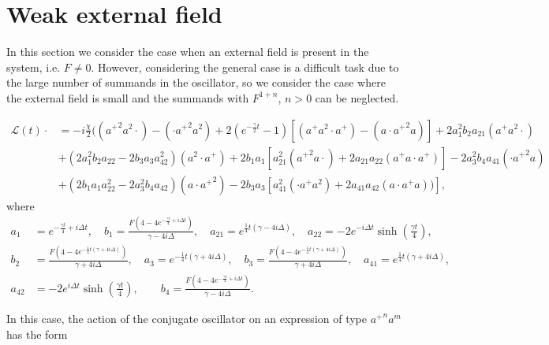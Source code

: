 \documentclass[12pt]{article}
\theoremstyle{definition}
\def\ga {\gamma}
\begin{document}
	\section{Weak external field\label{sec:Efc}}
	
	In this section we consider the case when an external field is present in the system, i.e. $F \not= 0$. However, considering the general case is a difficult task due to the large number of summands in the oscillator, so we consider the case where the external field is small and the summands with $F^{1 + n}$, $n > 0$ can be neglected. 
	
	\begin{align}
		\label{eq:GenIntWithF}
		\mathcal{L}(t)\cdot &= -i\frac{\chi}{2}(({a^+}^2a^2\cdot) - (\cdot{a^+}^2a^2) + 2(e^{-\frac{\ga}{2}t} -1 ) [({a^+}a^2\cdot {a^+}) - (a\cdot{a^+}^2a) ] +2a_1^2b_2a_{21}({a^+}a^2\cdot) \nonumber\\
		&+ (2a_1^2b_2a_{22} - 2b_3a_3a_{42}^2)(a^2\cdot{a^+}) + 2b_1a_1 [a_{21}^2({a^+}^2a\cdot) + 2a_{21}a_{22}({a^+}a\cdot{a^+})] - 2a_3^2b_4a_{41}(\cdot{a^+}^2a) \\
		&+ (2b_1a_1a_{22}^2 - 2a_3^2b_4a_{42})(a\cdot{a^+}^2) - 2b_3a_3[a_{41}^2(\cdot{a^+}a^2) + 2 a_{41}a_{42}(a\cdot{a^+}a)) ]\nonumber,
	\end{align}
	where
	\begin{align*}
		a_1 &= e^{-\frac{\gamma  t}{4}+i \Delta  t}, \quad
		b_1 = \frac{F \left(4-4 e^{-\frac{\gamma  t}{4}+i \Delta  t}\right)}{\gamma -4 i \Delta }, \quad
		a_{21} = e^{\frac{1}{4} t (\gamma -4 i \Delta )}, \quad
		a_{22} = -2 e^{-i \Delta  t} \sinh \left(\frac{\gamma  t}{4}\right),\\
		b_2 &= \frac{F \left(4-4 e^{-\frac{1}{4} t (\gamma +4 i \Delta )}\right)}{\gamma +4 i \Delta }, \quad
		a_3 = e^{-\frac{1}{4} t (\gamma +4 i \Delta )}, \quad
		b_3 = \frac{F \left(4-4 e^{-\frac{1}{4} t (\gamma +4 i \Delta )}\right)}{\gamma +4 i \Delta }, \quad
		a_{41} = e^{\frac{1}{4} t (\gamma +4 i \Delta )},\\
		a_{42} &= -2 e^{i \Delta  t} \sinh \left(\frac{\gamma  t}{4}\right), \qquad
		b_4 = \frac{F \left(4-4 e^{-\frac{\gamma  t}{4}+i \Delta  t}\right)}{\gamma -4 i \Delta }.
	\end{align*}
	
	In this case, the action of the conjugate oscillator on an expression of type ${a^+}^na^m$ has the form
	
\end{document}
